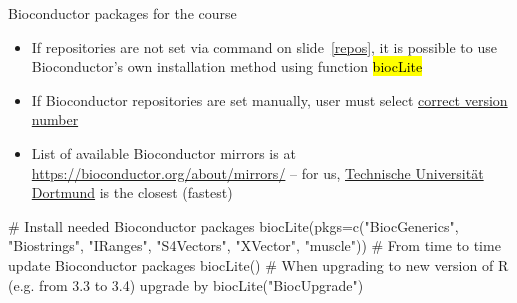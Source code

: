\documentclass[compress, ucs, xelatex, 11pt, xcolor=svgnames,
  hyperref={
    bookmarks=true,
    unicode=true,
    colorlinks=true,
    pdftitle={Molecular data in R},
    plainpages=false,
    pdfauthor={Vojtech Zeisek},
    pdfsubject={Course about phylogeny and evolution in R},
    pdfcreator={XeLaTeX},
    pdfkeywords={R, evolution, phylogeny, molecular data},
    linkcolor=Tomato,
    anchorcolor=SaddleBrown,
    citecolor=Goldenrod,
    filecolor=DarkMagenta,
    menucolor=Sienna,
    urlcolor=DarkTurquoise,
    pdftex},
  url={hyphens, lowtilde} %
  ]{beamer}
\renewcommand{\texttt}[1]{\hl{\ttfamily #1}}
\begin{document}
\begin{frame}[fragile]{Bioconductor packages for the course}
  \begin{itemize}
    \item If repositories are not set via command on slide~\ref{repos}, it is possible to use Bioconductor's own installation method using function \texttt{biocLite}
    \item If Bioconductor repositories are set manually, user must select \href{https://bioconductor.org/install/#bioc-version}{correct version number}
    \item List of available Bioconductor mirrors is at \url{https://bioconductor.org/about/mirrors/} -- for us, \href{https://bioconductor.statistik.tu-dortmund.de/}{Technische Universität Dortmund} is the closest (fastest)
  \end{itemize}
  \begin{spluscode}
    # Install needed Bioconductor packages
    biocLite(pkgs=c("BiocGenerics", "Biostrings", "IRanges", "S4Vectors",
      "XVector", "muscle"))
    # From time to time update Bioconductor packages
    biocLite()
    # When upgrading to new version of R (e.g. from 3.3 to 3.4) upgrade by
    biocLite("BiocUpgrade")
  \end{spluscode}
\end{frame}
\end{document}
